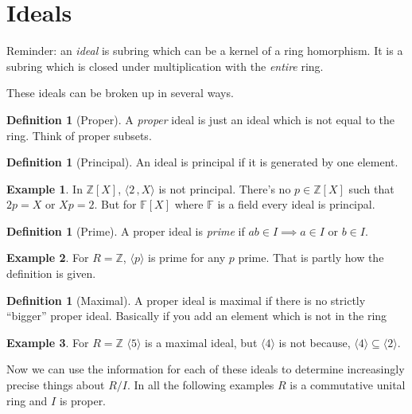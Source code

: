 \documentclass[11pt,a4paper]{article}
\theoremstyle{definition}
\newtheorem{definition}[theorem]{Definition}
\newtheorem*{example}{Example}
\begin{document}
\section{Ideals}

Reminder: an \emph{ideal} is subring which can be a kernel of a ring homorphism. It is a subring which is closed under multiplication with the \emph{entire} ring.

These ideals can be broken up in several ways.

\begin{definition}[Proper]
A \emph{proper} ideal is just an ideal which is not equal to the ring. Think of proper subsets.
\end{definition}

\begin{definition}[Principal]
An ideal is principal if it is generated by one element.
\end{definition}

\begin{example}
In $\mathbb{Z}[X]$, $\langle 2 \, , X \rangle$ is not principal. There's no $p \in \mathbb{Z}[X]$ such that $2p = X$ or $Xp = 2$. But for $\mathbb{F}[X]$ where $\mathbb{F}$ is a field every ideal is principal.
\end{example}


\begin{definition}[Prime]
A proper ideal is \emph{prime} if $ab \in I \implies a \in I $ or $b \in I$. 
\end{definition}

\begin{example}
For $R = \mathbb{Z}$, $\langle p \rangle$ is prime for any $p$ prime. That is partly how the definition is given. 
\end{example}

\begin{definition}[Maximal]
A proper ideal is maximal if there is no strictly ``bigger'' proper ideal. Basically if you add an element which is not in the ring
\end{definition}

\begin{example}
For $R = \mathbb{Z}$ $\langle 5 \rangle$ is a maximal ideal, but $\langle 4 \rangle$ is not because, $\langle 4\rangle \subseteq \langle 2 \rangle$.
\end{example}

Now we can use the information for each of these ideals to determine increasingly precise things about $R/I$. In all the following examples $R$ is a commutative unital ring and $I$ is proper.
\end{document}
